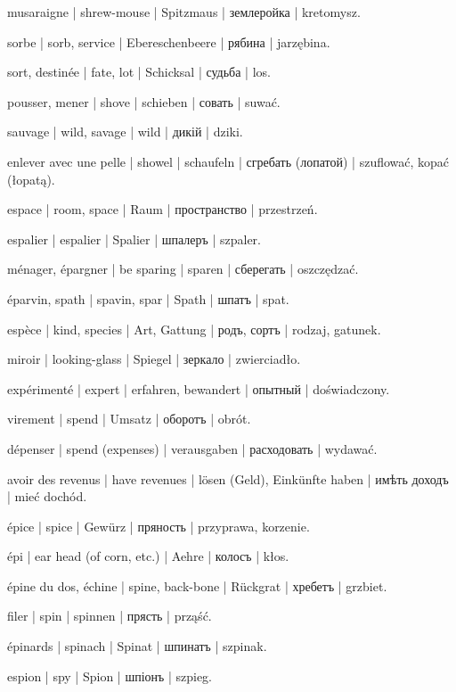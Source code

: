 \begin{outdent}{1em}
musaraigne | shrew-mouse | Spitzmaus | землеройка | kretomysz.

sorbe | sorb, service | Ebereschenbeere | рябина | jarzębina.

sort, destinée | fate, lot | Schicksal | судьба | los.

pousser, mener | shove | schieben | совать | suwać.

sauvage | wild, savage | wild | дикій | dziki.

enlever avec une pelle | showel | schaufeln | сгребать
(лопатой) | szuflować, kopać (łopatą).

espace | room, space | Raum | пространство | przestrzeń.

espalier | espalier | Spalier | шпалеръ | szpaler.

ménager, épargner | be sparing | sparen | сберегать | oszczędzać.

éparvin, spath | spavin, spar | Spath | шпатъ | spat.

espèce | kind, species | Art, Gattung | родъ, сортъ | rodzaj, gatunek.

miroir | looking-glass | Spiegel | зеркало | zwierciadło.

expérimenté | expert | erfahren, bewandert | опытный | doświadczony.

virement | spend | Umsatz | оборотъ | obrót.

\uvsubentry{}
dépenser | spend (expenses) | verausgaben | расходовать | wydawać.


\uvsubentry{}
avoir des revenus | have revenues | lösen (Geld), Einkünfte haben | имѣть доходъ | mieć dochód.

épice | spice | Gewürz | пряность | przyprawa, korzenie.

épi | ear head (of corn, etc.) | Aehre | колосъ | kłos.

épine du dos, échine | spine, back-bone | Rückgrat | хребетъ | grzbiet.

filer | spin | spinnen | прясть | prząść.

épinards | spinach | Spinat | шпинатъ | szpinak.

espion | spy | Spion | шпіонъ | szpieg.


\end{outdent}
